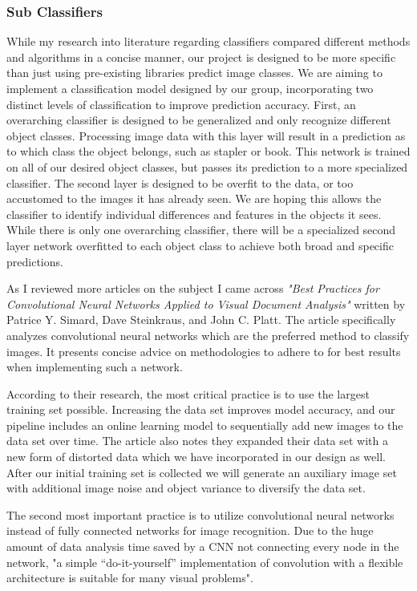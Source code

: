 \documentclass[draftclsnofoot, onecolumn, 10pt, compsoc]{IEEEtran}
\begin{document}
        \subsubsection{Sub Classifiers}
        	While my research into literature regarding classifiers compared different methods and algorithms in a concise manner, our project is designed to be more specific than just using pre-existing libraries predict image classes. We are aiming to implement a classification model designed by our group, incorporating two distinct levels of classification to improve prediction accuracy. First, an overarching classifier is designed to be generalized and only recognize different object classes. Processing image data with this layer will result in a prediction as to which class the object belongs, such as stapler or book. This network is trained on all of our desired object classes, but passes its prediction to a more specialized classifier. The second layer is designed to be overfit to the data, or too accustomed to the images it has already seen. We are hoping this allows the classifier to identify individual differences and features in the objects it sees. While there is only one overarching classifier, there will be a specialized second layer network overfitted to each object class to achieve both broad and specific predictions. 
            
As I reviewed more articles on the subject I came across \textit{"Best Practices for Convolutional Neural Networks Applied to Visual Document Analysis"} written by Patrice Y. Simard, Dave Steinkraus, and John C. Platt. The article specifically analyzes convolutional neural networks which are the preferred method to classify images. It presents concise advice on methodologies to adhere to for best results when implementing such a network. 
            
According to their research, the most critical practice is to use the largest training set possible. Increasing the data set improves model accuracy, and our pipeline includes an online learning model to sequentially add new images to the data set over time. The article also notes they expanded their data set with a new form of distorted data which we have incorporated in our design as well. After our initial training set is collected we will generate an auxiliary image set with additional image noise and object variance to diversify the data set. 
            
The second most important practice is to utilize convolutional neural networks instead of fully connected networks for image recognition. Due to the huge amount of data analysis time saved by a CNN not connecting every node in the network, "a simple “do-it-yourself” implementation of
convolution with a flexible architecture is suitable for many visual problems". \cite{simard2003best}
        
\end{document}
